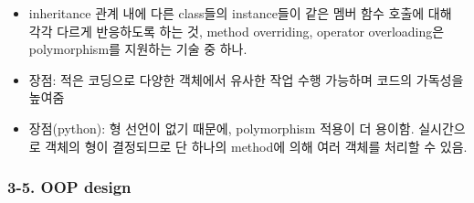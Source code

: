\begin{itemize}
  \begin{itemize}
  \tightlist
  \item
    inheritance 관계 내에 다른 class들의 instance들이 같은 멤버 함수
    호출에 대해 각각 다르게 반응하도록 하는 것, method overriding,
    operator overloading은 polymorphism를 지원하는 기술 중 하나.
  \item
    장점: 적은 코딩으로 다양한 객체에서 유사한 작업 수행 가능하며 코드의
    가독성을 높여줌
  \item
    장점(python): 형 선언이 없기 때문에, polymorphism 적용이 더 용이함.
    실시간으로 객체의 형이 결정되므로 단 하나의 method에 의해 여러
    객체를 처리할 수 있음.
  \end{itemize}
\end{itemize}

\hypertarget{oop-design}{%
\subsubsection{3-5. OOP design}\label{oop-design}}

